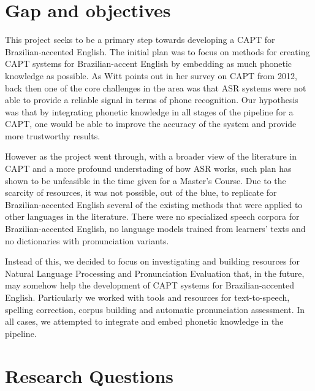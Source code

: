 \section*{Gap and objectives} 

This project seeks to be a primary step towards developing a \ac{CAPT} for Brazilian-accented English. The initial plan was to focus on methods for creating \ac{CAPT} systems for Brazilian-accent English by embedding as much phonetic knowledge as possible. As Witt \citep{Witt2012} points out in her survey on \ac{CAPT} from 2012, back then one of the core challenges in the area was that \ac{ASR} systems were not able to provide a reliable signal in terms of phone recognition. Our hypothesis was that by integrating phonetic knowledge in all stages of the pipeline for a \ac{CAPT}, one would be able to improve the accuracy of the system and provide more trustworthy results.

However as the project went through, with a broader view of the literature in \ac{CAPT} and a more profound understading of how \ac{ASR} works, such plan has shown to be unfeasible in the time given for a Master's Course. Due to the scarcity of resources, it was not possible, out of the blue, to replicate for Brazilian-accented English several of the existing methods that were applied to other languages in the literature. There were no specialized speech corpora for Brazilian-accented English, no language models trained from learners' texts and no dictionaries with pronunciation variants.

Instead of this, we decided to focus on investigating and building resources for Natural Language Processing and Pronunciation Evaluation that, in the future, may somehow help the development of \ac{CAPT} systems for Brazilian-accented English. Particularly we worked with tools and resources for text-to-speech, spelling correction, corpus building and automatic pronunciation assessment. In all cases, we attempted to integrate and embed phonetic knowledge in the pipeline.

\section*{Research Questions}

